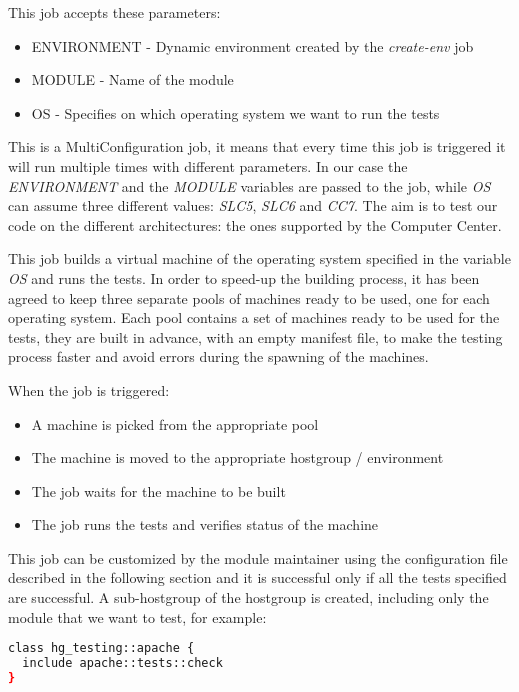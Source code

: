 This job accepts these parameters:

\begin{itemize}
  \item ENVIRONMENT - Dynamic environment created by the \textit{create-env} job
  \item MODULE - Name of the module
  \item OS - Specifies on which operating system we want to run the tests
\end{itemize}

This is a MultiConfiguration job, it means that every time this job is
triggered it will run multiple times with different parameters. In our
case the \textit{ENVIRONMENT} and the \textit{MODULE} variables are passed
to the job, while \textit{OS} can assume three different values:
\textit{SLC5}, \textit{SLC6} and \textit{CC7}. The aim is to test our code
on the different architectures: the ones supported by the Computer
Center.

This job builds a virtual machine of the operating system specified in the
variable \textit{OS} and runs the tests. In order to speed-up the building
process, it has been agreed to keep three separate pools of machines ready
to be used, one for each operating system. Each pool contains a set of
machines ready to be used for the tests, they are built in advance, with
an empty manifest file, to make the testing process faster and avoid
errors during the spawning of the machines.

When the job is triggered:

\begin{itemize}
  \item A machine is picked from the appropriate pool
  \item The machine is moved to the appropriate hostgroup / environment
  \item The job waits for the machine to be built
  \item The job runs the tests and verifies status of the machine
\end{itemize}

This job can be customized by the module maintainer using the
configuration file described in the following section and it is successful
only if all the tests specified are successful. A sub-hostgroup of the
hostgroup  is created, including only
the module that we want to test, for example:

\begin{lstlisting}[language=bash, frame=single]
class hg_testing::apache { 
  include apache::tests::check
}

\end{lstlisting}

